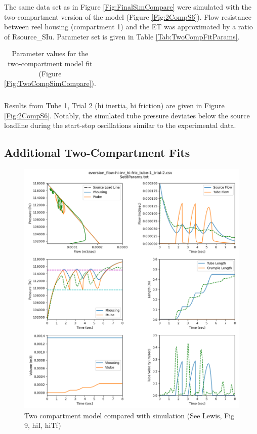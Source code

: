 \documentclass[letterpaper]{article}
\begin{document}
The same data set as in Figure \ref{Fig:FinalSimCompare} were simulated with the two-compartment version of the model (Figure \ref{Fig:2CompS6}).
Flow resistance between reel housing (compartment 1) and
the ET was approximated by a ratio of Rsource\_SIu.
Parameter set is given in Table \ref{Tab:TwoCompFitParams}.


\begin{table}\centering
\begin{tabular}{l|l|l}
\end{tabular}
\caption{Parameter values for the two-compartment model fit (Figure \ref{Fig:TwoCompSimCompare}).
}\label{Tab:FinalParams}
\end{table}



Results from Tube 1, Trial 2 (hi inertia, hi friction) are given in Figure \ref{Fig:2CompS6}.
Notably, the simulated tube pressure deviates below the source loadline during the start-stop
oscillations similar to the experimental data.

\clearpage


\subsection{Additional Two-Compartment Fits}

\begin{figure}[h]\centering
\includegraphics[width=.75\textwidth]{2CompSimulationSet8.png}
\caption{Two compartment model compared with simulation (See Lewis, Fig 9, hiI, hiTf)}
\label{Fig:2CompS8}
\end{figure}
\end{document}
